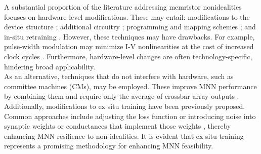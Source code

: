 \noindent A substantial proportion of the literature addressing memristor nonidealities focuses on hardware-level modifications. These may entail: modifications to the device structure \cite{fang2018improvement}; additional circuitry \cite{ambrogio2018equivalent, li2018analogue}; programming and mapping schemes \cite{xia2017stuck}; and in-situ retraining \cite{chen2017accelerator, jain2019cxdnn, wang2020ssm, li2019build}. However, these techniques may have drawbacks. For example, pulse-width modulation \cite{amirsoleimani2020memory} may minimize I-V nonlinearities at the cost of increased clock cycles \cite{cai2019fully}. Furthermore, hardware-level changes are often technology-specific, hindering broad applicability.\\



\noindent As an alternative, techniques that do not interfere with hardware, such as committee machines (CMs), may be employed. These improve MNN performance by combining them and require only the average of crossbar array outputs \cite{joksas2020committee}. Additionally, modifications to ex situ training have been previously proposed. Common approaches include adjusting the loss function \cite{zhu2020statistical} or introducing noise into synaptic weights \cite{he2019noise} or conductances that implement those weights \cite{joshi2020accurate}, thereby enhancing MNN resilience to non-idealities. It is evident that ex situ training represents a promising methodology for enhancing MNN feasibility.\\


